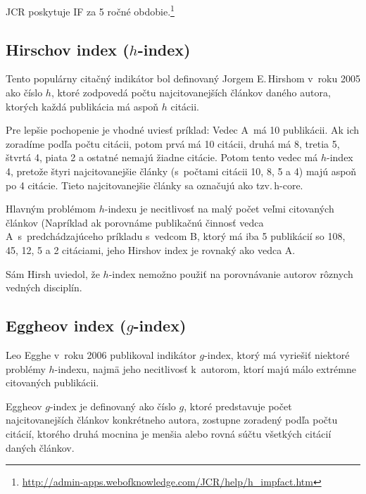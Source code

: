 JCR poskytuje IF za 5 ročné obdobie.\footnote{\url{http://admin-apps.webofknowledge.com/JCR/help/h_impfact.htm}}


\subsection{Hirschov index ($h$-index)}

Tento populárny citačný indikátor bol definovaný Jorgem E.\,Hirshom v~roku 2005
ako číslo $h$, ktoré zodpovedá počtu najcitovanejších článkov daného autora,
ktorých každá publikácia má aspoň $h$ citácii. \citep{Hirsch2005}

Pre lepšie pochopenie je vhodné uviesť príklad: Vedec A~má 10 publikácii.  Ak
ich zoradíme podľa počtu citácii, potom prvá má 10 citácii, druhá má 8, tretia
5, štvrtá 4, piata 2 a ostatné nemajú žiadne citácie.  Potom tento vedec má
$h$-index 4, pretože štyri najcitovanejšie články (s~počtami citácii 10, 8, 5 a
4) majú aspoň po 4 citácie.  Tieto najcitovanejšie články sa označujú ako
tzv.\,h-core.

Hlavným problémom $h$-indexu je necitlivosť na malý počet veľmi citovaných článkov
(Napríklad ak porovnáme publikačnú činnosť vedca A~s~predchádzajúceho príkladu
s~vedcom B, ktorý má iba 5 publikácií so 108, 45, 12, 5 a 2 citáciami, jeho
Hirshov index je rovnaký ako vedca A.

Sám Hirsh uviedol, že $h$-index nemožno použiť na porovnávanie autorov rôznych
vedných disciplín.


\subsection{Eggheov index ($g$-index)}

Leo Egghe v~roku 2006 publikoval indikátor $g$-index, ktorý má vyriešiť niektoré
problémy $h$-indexu, najmä jeho necitlivosť k~autorom, ktorí majú málo extrémne
citovaných publikácii. \citep{Egghe2006}

Eggheov $g$-index je definovaný ako číslo $g$, ktoré predstavuje počet
najcitovanejších článkov konkrétneho autora, zostupne zoradený podľa počtu
citácií, ktorého druhá mocnina je menšia alebo rovná súčtu všetkých citácií
daných článkov.

